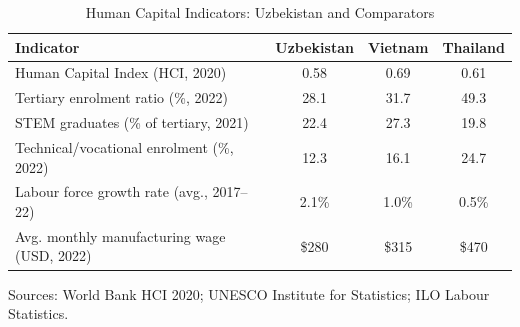 \begin{table}[!h]
\centering
\caption{\label{tab:human_capital}Human Capital Indicators: Uzbekistan and Comparators}
\centering
\begin{threeparttable}
\begin{tabular}[t]{lccc}
\toprule
Indicator & Uzbekistan & Vietnam & Thailand\\
\midrule
Human Capital Index (HCI, 2020) & 0.58 & 0.69 & 0.61\\
Tertiary enrolment ratio (\%, 2022) & 28.1 & 31.7 & 49.3\\
STEM graduates (\% of tertiary, 2021) & 22.4 & 27.3 & 19.8\\
Technical/vocational enrolment (\%, 2022) & 12.3 & 16.1 & 24.7\\
Labour force growth rate (avg., 2017--22) & 2.1\% & 1.0\% & 0.5\%\\
\addlinespace
Avg. monthly manufacturing wage (USD, 2022) & \$280 & \$315 & \$470\\
\bottomrule
\end{tabular}
\begin{tablenotes}
\item Sources: World Bank HCI 2020; UNESCO Institute for Statistics; ILO Labour Statistics.
\end{tablenotes}
\end{threeparttable}
\end{table}

